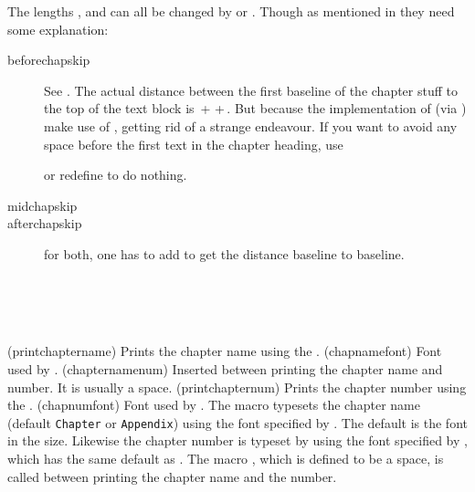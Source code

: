 The lengths \lnc{\beforechapskip}, \lnc{\midchapskip} and \lnc{\afterchapskip}
can all be changed by \cmd{\setlength} or \cmd{\addtolength}. Though
as mentioned in  they need some explanation:
\begingroup
\medskip
\setlength\overfullrule{5pt}
\setlength\unitlength{\textwidth}
\addtolength{}
\renewcommand\descriptionlabel[1]{\hspace\labelsep\parbox{\unitlength}{\cs{#1}}}
\begin{description}
\item[beforechapskip] See .  The actual distance
  between the first baseline of the chapter stuff to the top of the
  text block is
  \cmd{\beforechapskip}\,+\,\cmd{\topskip}\,+\,\cmd{\baselineskip}.
  But because the implementation of \cmd{\chapter} (via
  \cmd{\chapterheadstart}) make use of \cmd{\vspace*}, getting rid of
  \cmd{\beforechapskip} a strange endeavour. If you want to avoid any
  space before the first text in the chapter heading, use
  \begin{lcode}
    \setlength\beforechapskip{-\baselineskip}
  \end{lcode}
  or redefine \cmd{\chapterheadstart} to do nothing.
\item[midchapskip]
\item[afterchapskip]
  for both, one has to add \cmd{\baselineskip} to
  get the distance baseline to baseline.
\end{description}
\endgroup





\begin{syntax}
\cmd{\printchaptername} \cmd{\chapnamefont} \\
\cmd{\chapternamenum} \\
\cmd{\printchapternum} \cmd{\chapnumfont} \\
\end{syntax}
\glossary(printchaptername)%
  {}%
  {Prints the chapter name using the .}
\glossary(chapnamefont)%
  {}%
  {Font used by .}
\glossary(chapternamenum)%
  {}%
  {Inserted between printing the chapter name and number.
   It is usually a space.}
\glossary(printchapternum)%
  {}%
  {Prints the chapter number using the .}
\glossary(chapnumfont)%
  {}%
  {Font used by .}
The macro \cmd{\printchaptername} typesets the chapter name
(default \texttt{Chapter} or \texttt{Appendix}) using the font
specified by \cmd{\chapnamefont}. The default is the \cmd{\bfseries} font in
the \cmd{\huge} size. Likewise the chapter number is typeset by
\cmd{\printchapternum} using the font specified by \cmd{\chapnumfont},
which has the same default as \cmd{\chapnamefont}. The macro
\cmd{\chapternamenum}, which is defined to be a space, is called between
printing the chapter name and the number.

